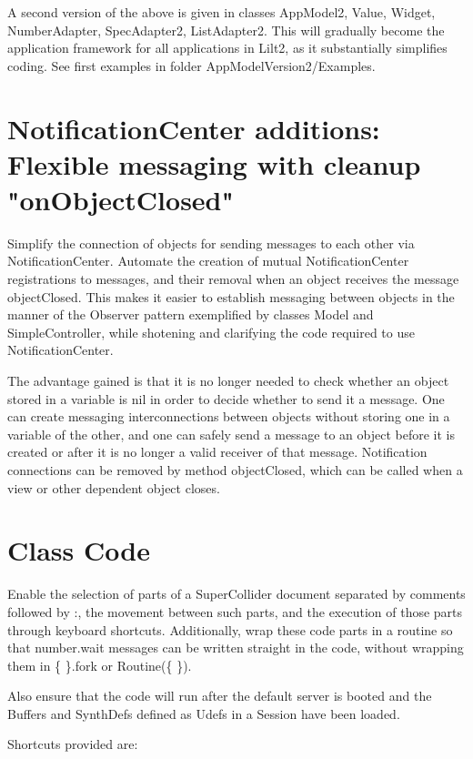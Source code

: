 \documentclass[11pt, a4paper]{scrartcl}
\begin{document}
A second version of the above is given in classes AppModel2, Value, Widget, NumberAdapter, SpecAdapter2, ListAdapter2. This will gradually become the application framework for all applications in Lilt2, as it substantially simplifies coding. See first examples in folder AppModelVersion2/Examples. 
\section*{NotificationCenter additions: Flexible messaging with cleanup "onObjectClosed"}
\label{sec-7}


Simplify the connection of objects for sending messages to each other via NotificationCenter. Automate the creation of mutual NotificationCenter registrations to messages, and their removal when an object receives the message objectClosed. This makes it easier to establish messaging between objects in the manner of the Observer pattern exemplified by classes Model and SimpleController, while shotening and clarifying the code required to use NotificationCenter.

The advantage gained is that it is no longer needed to check whether an object stored in a variable is nil in order to decide whether to send it a message. One can create messaging interconnections between objects without storing one in a variable of the other, and one can safely send a message to an object before it is created or after it is no longer a valid receiver of that message.  Notification connections can be removed by method objectClosed, which can be called when a view or other dependent object closes.
\section*{Class Code}
\label{sec-8}


Enable the selection of parts of a SuperCollider document separated by comments followed by :, the movement between such parts, and the execution of those parts through keyboard shortcuts. Additionally, wrap these code parts in a routine so that number.wait messages can be written straight in the code, without wrapping them in \{ \}.fork or Routine(\{ \}). 

Also ensure that the code will run after the default server is booted and the Buffers and SynthDefs defined as Udefs in a Session have been loaded. 

Shortcuts provided are:
\end{document}
